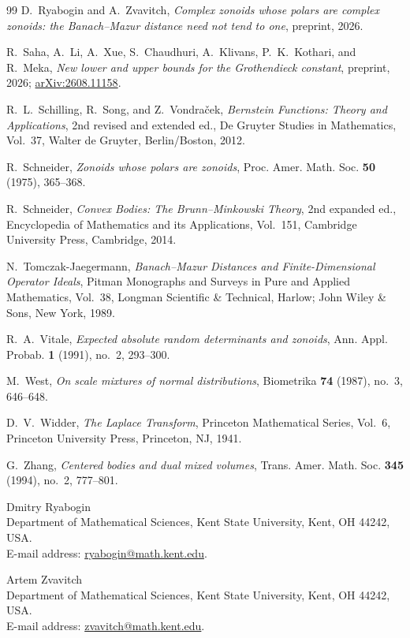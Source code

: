 \documentclass[11pt]{article}
\theoremstyle{definition}
\theoremstyle{remark}
\begin{document}
\begin{thebibliography}{99}
D.~Ryabogin and A.~Zvavitch,
\textit{Complex zonoids whose polars are complex zonoids:
the Banach--Mazur distance need not tend to one},
preprint, 2026.


R.~Saha, A.~Li, A.~Xue, S.~Chaudhuri, A.~Klivans,
P.~K.~Kothari, and R.~Meka,
\textit{New lower and upper bounds for the Grothendieck constant},
preprint, 2026;
\href{https://arxiv.org/abs/2608.11158}{arXiv:2608.11158}.

R.~L.~Schilling, R.~Song, and Z.~Vondra\v{c}ek,
\textit{Bernstein Functions: Theory and Applications},
2nd revised and extended ed., De Gruyter Studies in Mathematics,
Vol.~37, Walter de Gruyter, Berlin/Boston, 2012.

R.~Schneider,
\textit{Zonoids whose polars are zonoids},
Proc. Amer. Math. Soc. \textbf{50} (1975), 365--368.

R.~Schneider,
\textit{Convex Bodies: The Brunn--Minkowski Theory},
2nd expanded ed., Encyclopedia of Mathematics and its Applications,
Vol.~151, Cambridge University Press, Cambridge, 2014.

N.~Tomczak-Jaegermann,
\textit{Banach--Mazur Distances and Finite-Dimensional Operator Ideals},
Pitman Monographs and Surveys in Pure and Applied Mathematics, Vol.~38,
Longman Scientific \& Technical, Harlow; John Wiley \& Sons,
New York, 1989.

R.~A.~Vitale,
\textit{Expected absolute random determinants and zonoids},
Ann. Appl. Probab. \textbf{1} (1991), no.~2, 293--300.

M.~West,
\textit{On scale mixtures of normal distributions},
Biometrika \textbf{74} (1987), no.~3, 646--648.

D.~V.~Widder,
\textit{The Laplace Transform},
Princeton Mathematical Series, Vol.~6,
Princeton University Press, Princeton, NJ, 1941.

G.~Zhang,
\textit{Centered bodies and dual mixed volumes},
Trans. Amer. Math. Soc. \textbf{345} (1994), no.~2, 777--801.



\end{thebibliography}

\vspace{2mm}
\noindent Dmitry Ryabogin\\
Department of Mathematical Sciences, Kent State University, Kent, OH 44242, USA.\\
E-mail address: \href{mailto:ryabogin@math.kent.edu}{ryabogin@math.kent.edu}.

\vspace{2mm}
\noindent Artem Zvavitch\\
Department of Mathematical Sciences, Kent State University, Kent, OH 44242, USA.\\
E-mail address: \href{mailto:zvavitch@math.kent.edu}{zvavitch@math.kent.edu}.
\end{document}
